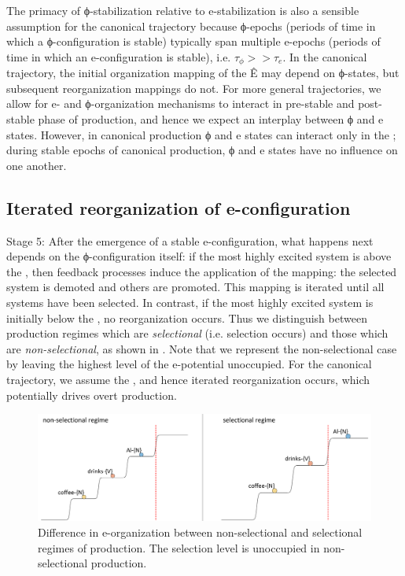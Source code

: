 The primacy of ϕ-stabilization relative to e-stabilization is also a sensible assumption for the canonical trajectory because ϕ-epochs (periods of time in which a ϕ-configuration is stable) typically span multiple e-epochs (periods of time in which an e-configuration is stable), i.e. $\tau_{\phi} >> \tau_e$. In the canonical trajectory, the initial organization mapping of the  Ê may depend on ϕ-states, but subsequent reorganization mappings do not. For more general trajectories, we allow for e- and ϕ-organization mechanisms to interact in pre-stable and post-stable phase of production, and hence we expect an interplay between ϕ and e states. However, in canonical production ϕ and e states can interact only in the ; during stable epochs of canonical production, ϕ and e states have no influence on one another. 

\subsection{Iterated reorganization of e-configuration}
Stage 5: After the emergence of a stable e-configuration, what happens next depends on the ϕ-configuration itself: if the most highly excited system is above the , then feedback processes induce the application of the  mapping: the selected system is demoted and others are promoted. This mapping is iterated until all systems have been selected. In contrast, if the most highly excited system is initially below the , no reorganization occurs. Thus we distinguish between production regimes which are \textit{selectional} (i.e. selection occurs) and those which are \textit{non-selectional}, as shown in {}. Note that we represent the non-selectional case by leaving the highest level of the e-potential unoccupied. For the canonical trajectory, we assume the , and hence iterated reorganization occurs, which potentially drives overt production. 

  
\begin{figure}
\includegraphics[width=\textwidth]{figures/Tilsen-img53.png}
\caption{Difference in e-organization between non-selectional and selectional regimes of production. The selection level is unoccupied in non-selectional production.}
\label{fig:4:3}
\end{figure}
 

